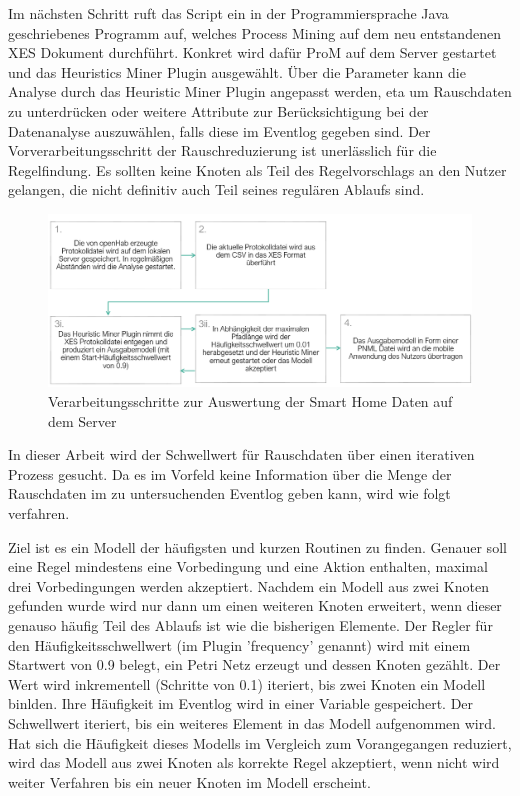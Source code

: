 Im nächsten Schritt ruft das Script ein in der Programmiersprache Java geschriebenes Programm auf, welches Process Mining auf dem neu entstandenen XES Dokument durchführt. Konkret wird dafür ProM auf dem Server gestartet und das Heuristics Miner Plugin ausgewählt.
Über die Parameter kann die Analyse durch das Heuristic Miner Plugin angepasst werden, eta um Rauschdaten zu unterdrücken oder weitere Attribute zur Berücksichtigung bei der Datenanalyse auszuwählen, falls diese im Eventlog gegeben sind. Der Vorverarbeitungsschritt der Rauschreduzierung ist unerlässlich für die Regelfindung. Es sollten keine Knoten als Teil des Regelvorschlags an den Nutzer gelangen, die nicht definitiv auch Teil seines regulären Ablaufs sind. 

\begin{figure}[!h]
    \centering
    \includegraphics[width=\textwidth,origin=c]{figures/Appbildungen/ServerSchritte.PNG}
    \caption{Verarbeitungsschritte zur Auswertung der Smart Home Daten auf dem Server}
    \label{fig:server}
\end{figure}

In dieser Arbeit wird der Schwellwert für Rauschdaten über einen iterativen Prozess gesucht. Da es im Vorfeld keine Information über die Menge der Rauschdaten im zu untersuchenden Eventlog geben kann, wird wie folgt verfahren. 

Ziel ist es ein Modell der häufigsten und kurzen Routinen zu finden. Genauer soll eine Regel mindestens eine Vorbedingung und eine Aktion enthalten, maximal drei Vorbedingungen werden akzeptiert. Nachdem ein Modell aus zwei Knoten gefunden wurde wird nur dann um einen weiteren Knoten erweitert, wenn dieser genauso häufig Teil des Ablaufs ist wie die bisherigen Elemente. Der Regler für den Häufigkeitsschwellwert (im Plugin 'frequency' genannt) wird mit einem Startwert von 0.9 belegt, ein Petri Netz erzeugt und dessen Knoten gezählt. Der Wert wird inkrementell (Schritte von 0.1) iteriert, bis zwei Knoten ein Modell binlden. Ihre Häufigkeit im Eventlog wird in einer Variable gespeichert. Der Schwellwert iteriert, bis ein weiteres Element in das Modell aufgenommen wird. Hat sich die Häufigkeit dieses Modells im Vergleich zum Vorangegangen reduziert, wird das Modell aus zwei Knoten als korrekte Regel akzeptiert, wenn nicht wird weiter Verfahren bis ein neuer Knoten im Modell erscheint.

